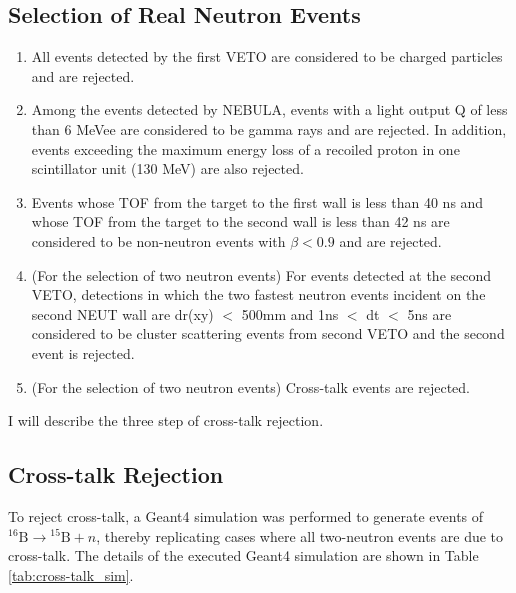\subsection {Selection of Real Neutron Events}
\begin{enumerate}
    \item All events detected by the first VETO are considered to be charged particles and are rejected.
    \item Among the events detected by NEBULA, events with a light output Q of less than 6 MeVee are considered to be gamma rays and are rejected. In addition, events exceeding the maximum energy loss of a recoiled proton in one scintillator unit (130 MeV) are also rejected.
    \item Events whose TOF from the target to the first wall is less than 40 ns and whose TOF from the target to the second wall is less than 42 ns are considered to be non-neutron events with $\beta < 0.9$ and are rejected.
    \item (For the selection of two neutron events) For events detected at the second VETO, detections in which the two fastest neutron events incident on the second NEUT wall are dr(xy) $<$ 500mm and 1ns $<$ dt $<$ 5ns are considered to be cluster scattering events from second VETO and the second event is rejected.
    \item (For the selection of two neutron events) Cross-talk events are rejected.
\end{enumerate}
I will describe the three step of cross-talk rejection.

\subsection{Cross-talk Rejection}
To reject cross-talk, a Geant4 simulation was performed to generate events of ${}^{16}\text{B} \to {}^{15}\text{B}+n$, thereby replicating cases where all two-neutron events are due to cross-talk. The details of the executed Geant4 simulation are shown in Table \ref{tab:cross-talk_sim}.

